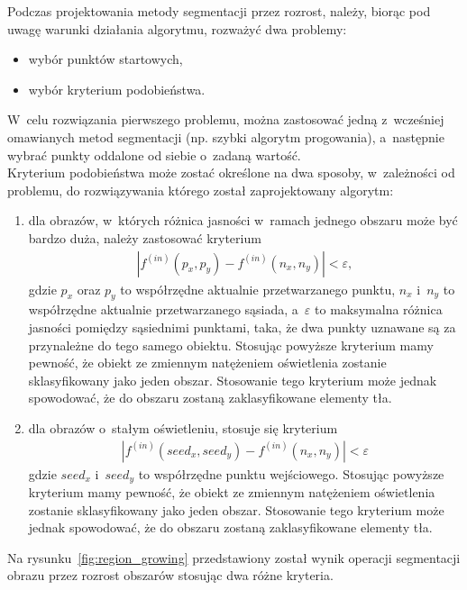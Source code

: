 Podczas projektowania metody segmentacji przez rozrost, należy, biorąc pod uwagę warunki działania algorytmu, rozważyć dwa problemy:
\begin{itemize}
  \item wybór punktów startowych,
  \item wybór kryterium podobieństwa.
\end{itemize}
 W~celu rozwiązania pierwszego problemu, można zastosować jedną z~wcześniej omawianych metod segmentacji (np. szybki algorytm progowania), a~następnie wybrać punkty oddalone od siebie o~zadaną wartość. \\
Kryterium podobieństwa może zostać określone na dwa sposoby, w~zależności od problemu, do rozwiązywania którego został zaprojektowany algorytm:
\begin{enumerate}
  \item dla obrazów, w~których różnica jasności w~ramach jednego obszaru może być bardzo duża, należy zastosować kryterium 
    \begin{gather*}
      |f^{(in)}(p_x, p_y) - f^{(in)}(n_x, n_y)| < \varepsilon,
    \end{gather*}
    gdzie $p_x$ oraz $p_y$ to współrzędne aktualnie przetwarzanego punktu, $n_x$ i~$n_y$ to współrzędne aktualnie przetwarzanego sąsiada, a~$\varepsilon$ to maksymalna różnica jasności pomiędzy sąsiednimi punktami, taka, że dwa punkty uznawane są za przynależne do tego samego obiektu. Stosując powyższe kryterium mamy pewność, że obiekt ze zmiennym natężeniem oświetlenia zostanie sklasyfikowany jako jeden obszar. Stosowanie tego kryterium może jednak spowodować, że do obszaru zostaną zaklasyfikowane elementy tła.
    \item dla obrazów o~stałym oświetleniu, stosuje się kryterium
      \begin{gather*}
        |f^{(in)}(seed_x, seed_y) - f^{(in)}(n_x, n_y)| < \varepsilon
      \end{gather*}
      gdzie $seed_x$ i~$seed_y$ to współrzędne punktu wejściowego. Stosując powyższe kryterium mamy pewność, że obiekt ze zmiennym natężeniem oświetlenia zostanie sklasyfikowany jako jeden obszar. Stosowanie tego kryterium może jednak spowodować, że do obszaru zostaną zaklasyfikowane elementy tła.
\end{enumerate}
Na rysunku~\ref{fig:region_growing} przedstawiony został wynik operacji segmentacji obrazu przez rozrost obszarów stosując dwa różne kryteria.
